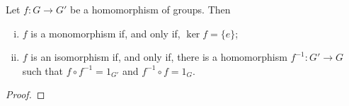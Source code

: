 \documentclass[../main.tex]{subfiles}
\begin{document}
\begin{ter}
\label{ter:homomorphism} Let $f:G\rightarrow G'$ be a homomorphism of groups. Then
\begin{enumerate}[(i)]
    \item $f$ is a monomorphism if, and only if, $\ker f = \{e\}$;
    \item $f$ is an isomorphism if, and only if, there is a homomorphism $f^{-1}:G'\rightarrow G$ such that $f\circ f^{-1} = 1_{G'}$ and $f^{-1}\circ f = 1_G$.
\end{enumerate}
\end{ter}
\begin{proof}
\noproof
\end{proof}
\end{document}
